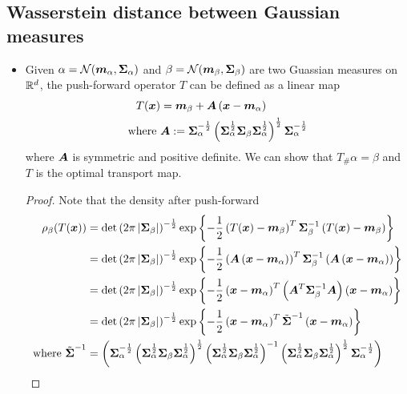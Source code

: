 \documentclass[11pt]{article}
\begin{document}
\subsection{Wasserstein distance between Gaussian measures}
\begin{itemize}
\item Given $\alpha = {\mathcal N}(\boldsymbol{m}_{\alpha}, \boldsymbol{\Sigma}_{\alpha})$ and $\beta = {\mathcal N}(\boldsymbol{m}_{\beta}, \boldsymbol{\Sigma}_{\beta})$ are two Guassian measures on ${\mathbb R}^{d}$, the push-forward operator $T$ can be defined as a linear map
\begin{align}
T(\boldsymbol{x}) &= \boldsymbol{m}_{\beta} + \boldsymbol{A}\left(\boldsymbol{x} - \boldsymbol{m}_{\alpha}\right) \label{eqn: gaussian_push_forward}\\
\text{where }&\boldsymbol{A} := \boldsymbol{\Sigma}_{\alpha}^{-\frac{1}{2}}\left( \boldsymbol{\Sigma}_{\alpha}^{\frac{1}{2}}\boldsymbol{\Sigma}_{\beta}\boldsymbol{\Sigma}_{\alpha}^{\frac{1}{2}}\right)^{\frac{1}{2}}\boldsymbol{\Sigma}_{\alpha}^{-\frac{1}{2}} \nonumber
\end{align} where $\boldsymbol{A}$ is symmetric and positive definite. We can show that $T_{\#}\alpha = \beta$ and $T$ is the optimal transport map.
\begin{proof}
Note that the density after push-forward
\begin{align*}
\rho_{\beta}(T(\mb{x})) &= \det\paren{2\pi\abs{\mb{\Sigma}_{\beta}}}^{-\frac{1}{2}}\exp\set{-\frac{1}{2}\paren{T(\mb{x}) - \mb{m}_{\beta}}^{T}\mb{\Sigma}_{\beta}^{-1}\paren{T(\mb{x}) - \mb{m}_{\beta}} } \\
&= \det\paren{2\pi\abs{\mb{\Sigma}_{\beta}}}^{-\frac{1}{2}}\exp\set{-\frac{1}{2}\paren{\mb{A}\paren{\mb{x} - \mb{m}_{\alpha}}}^{T}\mb{\Sigma}_{\beta}^{-1}\paren{\mb{A}\paren{\mb{x} - \mb{m}_{\alpha}}} } \\
&=  \det\paren{2\pi\abs{\mb{\Sigma}_{\beta}}}^{-\frac{1}{2}}\exp\set{-\frac{1}{2}\paren{\mb{x} - \mb{m}_{\alpha}}^{T}\paren{\mb{A}^{T}\mb{\Sigma}_{\beta}^{-1}\mb{A}}\paren{\mb{x} - \mb{m}_{\alpha}} } \\
&= \det\paren{2\pi\abs{\mb{\Sigma}_{\beta}}}^{-\frac{1}{2}}\exp\set{-\frac{1}{2}\paren{\mb{x} - \mb{m}_{\alpha}}^{T}\tilde{\mb{\Sigma}}^{-1}\paren{\mb{x} - \mb{m}_{\alpha}} }\\
\text{where }\tilde{\mb{\Sigma}}^{-1}&=\paren{ \mb{\Sigma}_{\alpha}^{-\frac{1}{2}}\paren{ \mb{\Sigma}_{\alpha}^{\frac{1}{2}}\mb{\Sigma}_{\beta}\mb{\Sigma}_{\alpha}^{\frac{1}{2}}}^{\frac{1}{2}}\paren{\mb{\Sigma}_{\alpha}^{\frac{1}{2}} \mb{\Sigma}_{\beta} \mb{\Sigma}_{\alpha}^{\frac{1}{2}}}^{-1}\paren{ \mb{\Sigma}_{\alpha}^{\frac{1}{2}}\mb{\Sigma}_{\beta}\mb{\Sigma}_{\alpha}^{\frac{1}{2}}}^{\frac{1}{2}}\mb{\Sigma}_{\alpha}^{-\frac{1}{2}} } \\

\end{align*}
\end{proof}
\end{itemize}
\end{document}
